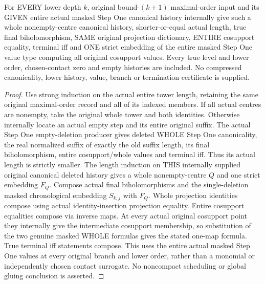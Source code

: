 \begin{theorem}
\label{hir:original-finite-step-empty-free-canonical-compression}
\leanok
For EVERY lower depth $k$, original bound-$(k+1)$ maximal-order input and
its GIVEN entire actual masked Step One canonical history internally give
such a whole nonempty-centre canonical history, shorter-or-equal actual
length, true final biholomorphism, SAME original projection dictionary,
ENTIRE cosupport equality, terminal iff and ONE strict embedding of the
entire masked Step One value type computing all original cosupport values.
Every true level and lower order, chosen-contact zero and empty histories
are included. No compressed canonicality, lower history, value, branch
or termination certificate is supplied.
\end{theorem}
\begin{proof}
Use strong induction on the actual entire tower length, retaining the
same original maximal-order record and all of its indexed members. If
all actual centres are nonempty, take the original whole tower and both
identities. Otherwise internally locate an actual empty step and its
entire original suffix. The actual Step One empty-deletion producer gives
deleted WHOLE Step One canonicality, the real normalized suffix of exactly
the old suffix length, its final biholomorphism, entire cosupport/whole
values and terminal iff. Thus its actual length is strictly smaller. The
length induction on THIS internally supplied original canonical deleted
history gives a whole nonempty-centre $Q$ and one strict embedding $F_Q$.
Compose actual final biholomorphisms and the single-deletion masked
chronological embedding $S_{k,j}$ with $F_Q$. Whole projection identities
compose using actual identity-insertion projection equality. Entire
cosupport equalities compose via inverse maps. At every actual original
cosupport point they internally give the intermediate cosupport membership,
so substitution of the two genuine masked WHOLE formulas gives the stated
one-map formula. True terminal iff statements compose. This uses the
entire actual masked Step One values at every original branch and lower
order, rather than a monomial or independently chosen contact surrogate.
No noncompact scheduling or global gluing conclusion is asserted.
\end{proof}
